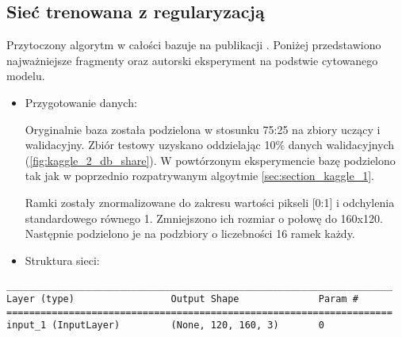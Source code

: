 \subsection{Sieć trenowana z regularyzacją}
Przytoczony algorytm w całości bazuje na publikacji \cite{kaggle_2}. Poniżej przedstawiono najważniejsze fragmenty oraz autorski eksperyment na podstwie cytowanego modelu.

{\parindent0pt %
\begin{itemize}
\item Przygotowanie danych:

Oryginalnie baza została podzielona w stosunku 75:25 na zbiory uczący i walidacyjny. Zbiór testowy uzyskano oddzielając 10\% danych walidacyjnych (\ref{fig:kaggle_2_db_share}). W powtórzonym eksperymencie bazę podzielono tak jak w poprzednio rozpatrywanym algoytmie \ref{sec:section_kaggle_1}.

Ramki zostały znormalizowane do zakresu wartości pikseli [0:1] i odchylenia standardowego równego 1. Zmniejszono ich rozmiar o połowę do 160x120. Następnie podzielono je na podzbiory o liczebności 16 ramek każdy.

\item Struktura sieci:
\end{itemize}

\newsavebox\myv
\begin{lrbox}{\myv}
\setlength{\myminipagewidth}{0.9\linewidth} %
\setlength{\myminipagecentering}{(\linewidth-\myminipagewidth)/2}
\noindent\hspace{\myminipagecentering}\begin{minipage}{\myminipagewidth}
\begin{verbatim}
____________________________________________________________________
Layer (type)                 Output Shape              Param #   
====================================================================
input_1 (InputLayer)         (None, 120, 160, 3)       0        
\end{verbatim} 
\end{minipage}\end{lrbox}
\resizebox{0.75\textwidth}{!}{\usebox\myv}

}
